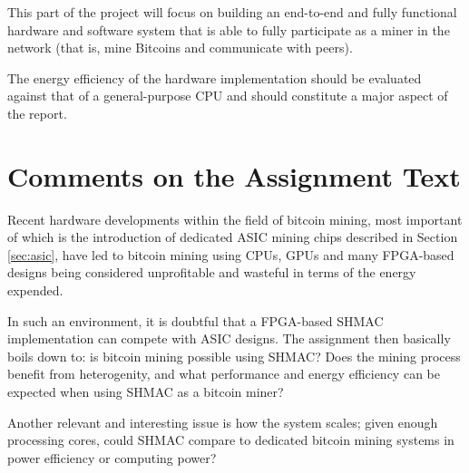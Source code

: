 This part of the project will focus on building an end-to-end and fully functional
hardware and software system that is able to fully participate as a miner in the
network (that is, mine Bitcoins and communicate with peers).

The energy efficiency of the hardware implementation should be evaluated against that
of a general-purpose CPU and should constitute a major aspect of the report.

\section{Comments on the Assignment Text}

Recent hardware developments within the field of bitcoin mining, most important of
which is the introduction of dedicated ASIC mining chips described in Section \ref{sec:asic},
have led to bitcoin mining using CPUs, GPUs and many FPGA-based designs being considered
unprofitable and wasteful in terms of the energy expended.

In such an environment, it is doubtful that a FPGA-based SHMAC implementation can compete
with ASIC designs. The assignment then basically boils down to: is bitcoin mining possible using SHMAC?
Does the mining process benefit from heterogenity, and what performance and energy
efficiency can be expected when using SHMAC as a bitcoin miner?

Another relevant and interesting issue is how the system scales; given enough processing
cores, could SHMAC compare to dedicated bitcoin mining systems in power efficiency or
computing power?


